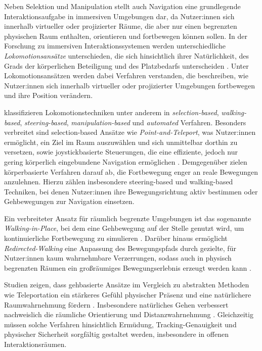 Neben Selektion und Manipulation stellt auch Navigation eine grundlegende Interaktionsaufgabe in immersiven Umgebungen dar, da Nutzer:innen sich innerhalb virtueller oder projizierter Räume, die aber nur einen begrenzten physischen Raum enthalten, orientieren und fortbewegen können sollen. In der Forschung zu immersiven Interaktionssystemen werden unterschiedliche \textit{Lokomotionsansätze} unterschieden, die sich hinsichtlich ihrer Natürlichkeit, des Grads der körperlichen Beteiligung und des Platzbedarfs unterscheiden \parencite{martinez2022researchTrendsInVirtualRealityLocomotionTechniques}. Unter Lokomotionsansätzen werden dabei Verfahren verstanden, die beschreiben, wie Nutzer:innen sich innerhalb virtueller oder projizierter Umgebungen fortbewegen und ihre Position verändern.

\textcite{martinez2022researchTrendsInVirtualRealityLocomotionTechniques} klassifizieren Lokomotionstechniken unter anderem in \textit{selection-based}, \textit{walking-based}, \textit{steering-based}, \textit{manipulation-based} und \textit{automated} Verfahren. Besonders verbreitet sind selection-based Ansätze wie \textit{Point-and-Teleport}, was Nutzer:innen ermöglicht, ein Ziel im Raum auszuwählen und sich unmittelbar dorthin zu versetzen, sowie joystickbasierte Steuerungen, die eine effiziente, jedoch nur gering körperlich eingebundene Navigation ermög\-lichen \parencite{martinez2022researchTrendsInVirtualRealityLocomotionTechniques}. Demgegenüber zielen körper\-basierte Verfahren darauf ab, die Fortbewegung enger an reale Bewegungen anzulehnen. Hierzu zählen insbesondere steering-based und walking-based Techniken, bei denen Nutzer:innen ihre Bewegungsrichtung aktiv bestimmen oder Gehbewegungen zur Navigation einsetzen.

Ein verbreiteter Ansatz für räumlich begrenzte Umgebungen ist das sogenannte \textit{Walking-in-Place}, bei dem eine Gehbewegung auf der Stelle genutzt wird, um kontinuierliche Fortbewegung zu simulieren \parencite{martinez2022researchTrendsInVirtualRealityLocomotionTechniques, deBack2024naturalAndRedirectedWalkingInVirtualReality}. Darüber hinaus ermöglicht \textit{Redirected-Walking} eine Anpassung des Bewegungspfads durch gezielte, für Nutzer:innen kaum wahrnehmbare Verzerrungen, sodass auch in physisch begrenzten Räumen ein großräumiges Bewegungserlebnis erzeugt werden kann \parencite{deBack2024naturalAndRedirectedWalkingInVirtualReality}.

Studien zeigen, dass gehbasierte Ansätze im Vergleich zu abstrakten Methoden wie Teleportation ein stärkeres Gefühl physischer Präsenz und eine natürlichere Raumwahrnehmung fördern \parencite{martinez2022researchTrendsInVirtualRealityLocomotionTechniques, deBack2024naturalAndRedirectedWalkingInVirtualReality}. Insbesondere natürliches Gehen verbessert nachweislich die räumliche Orientierung und Distanzwahrnehmung \parencite{deBack2024naturalAndRedirectedWalkingInVirtualReality}. Gleichzeitig müssen solche Verfahren hinsichtlich Ermüdung, Tracking-Genauigkeit und physischer Sicherheit sorgfältig gestaltet werden, insbesondere in offenen Interaktionsräumen.

